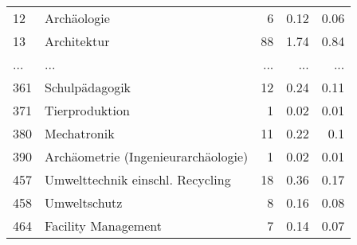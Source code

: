 \begin{longtable}{lXrrr}
        12 & \multicolumn{1}{X}{Archäologie} & %
          \num{6} &
          \num[round-mode=places,round-precision=2]{0,12} &
          \num[round-mode=places,round-precision=2]{0,06} \\
        13 & \multicolumn{1}{X}{Architektur} & %
          \num{88} &
          \num[round-mode=places,round-precision=2]{1,74} &
          \num[round-mode=places,round-precision=2]{0,84} \\
       ... & ... & ... & ... & ... \\
        361 & \multicolumn{1}{X}{Schulpädagogik} & %
          \num{12} &
          \num[round-mode=places,round-precision=2]{0,24} &
          \num[round-mode=places,round-precision=2]{0,11} \\

        371 & \multicolumn{1}{X}{Tierproduktion} & %
          \num{1} &
          \num[round-mode=places,round-precision=2]{0,02} &
          \num[round-mode=places,round-precision=2]{0,01} \\

        380 & \multicolumn{1}{X}{Mechatronik} & %
          \num{11} &
          \num[round-mode=places,round-precision=2]{0,22} &
          \num[round-mode=places,round-precision=2]{0,1} \\

        390 & \multicolumn{1}{X}{Archäometrie (Ingenieurarchäologie)} & %
          \num{1} &
          \num[round-mode=places,round-precision=2]{0,02} &
          \num[round-mode=places,round-precision=2]{0,01} \\

        457 & \multicolumn{1}{X}{Umwelttechnik einschl. Recycling} & %
          \num{18} &
          \num[round-mode=places,round-precision=2]{0,36} &
          \num[round-mode=places,round-precision=2]{0,17} \\

        458 & \multicolumn{1}{X}{Umweltschutz} & %
          \num{8} &
          \num[round-mode=places,round-precision=2]{0,16} &
          \num[round-mode=places,round-precision=2]{0,08} \\

        464 & \multicolumn{1}{X}{Facility Management} & %
          \num{7} &
          \num[round-mode=places,round-precision=2]{0,14} &
          \num[round-mode=places,round-precision=2]{0,07} \\


\end{longtable}
